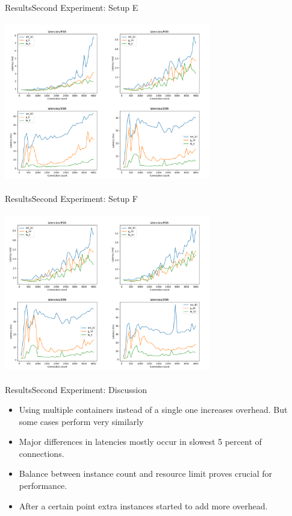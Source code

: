 \documentclass{beamer}
\begin{document}
\begin{frame}{Results}{Second Experiment: Setup E}
  \begin{center}
   \includegraphics[height=7cm, width=9cm]{figures/multi1250_2500.png}
  \end{center}
\end{frame}

\begin{frame}{Results}{Second Experiment: Setup F}
  \begin{center}
   \includegraphics[height=7cm, width=9cm]{figures/multi2500_5000.png}
  \end{center}
\end{frame}

\begin{frame}{Results}{Second Experiment: Discussion}
 \begin{itemize}
  \item Using multiple containers instead of a single one increases overhead. But
  some cases perform very similarly
  \item Major differences in latencies mostly occur in slowest 5 percent of connections.
  \item Balance between instance count and resource limit proves crucial for performance.
  \item After a certain point extra instances started to add more overhead.
 \end{itemize}
\end{frame}
\end{document}
